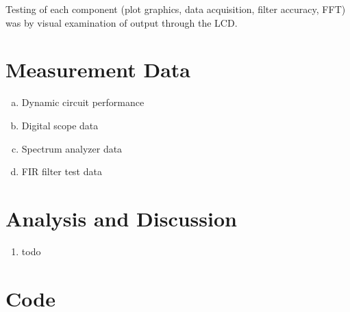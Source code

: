 \documentclass[12pt]{article}
\begin{document}
Testing of each component (plot graphics, data acquisition, filter
accuracy, FFT) was by visual examination of output through the
LCD.

\section{Measurement Data}
\begin{enumerate}[a)]
  \item Dynamic circuit performance
  \item Digital scope data
  \item Spectrum analyzer data
  \item FIR filter test data
\end{enumerate}

\section{Analysis and Discussion}
\begin{enumerate}[1)]
  \item todo
\end{enumerate}

\section{Code}

\end{document}
